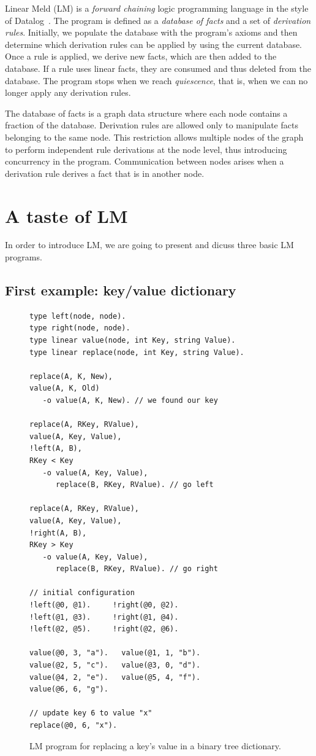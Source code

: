 
Linear Meld (LM) is a \emph{forward chaining} logic programming language in the
style of Datalog~\cite{Ullman:1990:PDK:533142}. The program is defined as a
\emph{database of facts} and a set of \emph{derivation rules}.  Initially, we
populate the database with the program's axioms and then determine which
derivation rules can be applied by using the current database. Once a rule is
applied, we derive new facts, which are then added to the database.  If a rule
uses linear facts, they are consumed and thus deleted from the database.  The
program stops when we reach \emph{quiescence}, that is, when we can no longer
apply any derivation rules.

The database of facts is a graph data structure where each node contains a
fraction of the database.  Derivation rules are allowed only to manipulate
facts belonging to the same node. This restriction allows multiple nodes of the graph
to perform independent rule derivations at the node level, thus introducing
concurrency in the program. Communication between nodes arises when a derivation
rule derives a fact that is in another node.

\section{A taste of LM}

In order to introduce LM, we are going to present and dicuss three basic LM
programs.

\subsection{First example: key/value dictionary}

\begin{figure}[ht]
{\scriptsize
\begin{Verbatim}[numbers=right]
type left(node, node).
type right(node, node).
type linear value(node, int Key, string Value).
type linear replace(node, int Key, string Value).

replace(A, K, New),
value(A, K, Old)
   -o value(A, K, New). // we found our key

replace(A, RKey, RValue),
value(A, Key, Value),
!left(A, B),
RKey < Key
   -o value(A, Key, Value),
      replace(B, RKey, RValue). // go left

replace(A, RKey, RValue),
value(A, Key, Value),
!right(A, B),
RKey > Key
   -o value(A, Key, Value),
      replace(B, RKey, RValue). // go right

// initial configuration
!left(@0, @1).     !right(@0, @2).
!left(@1, @3).     !right(@1, @4). 
!left(@2, @5).     !right(@2, @6).

value(@0, 3, "a").   value(@1, 1, "b").
value(@2, 5, "c").   value(@3, 0, "d").
value(@4, 2, "e").   value(@5, 4, "f").
value(@6, 6, "g").

// update key 6 to value "x"
replace(@0, 6, "x").
\end{Verbatim}
}
\caption{LM program for replacing a key's value in a binary tree dictionary.}
\label{code:btree_replace}
\end{figure}

